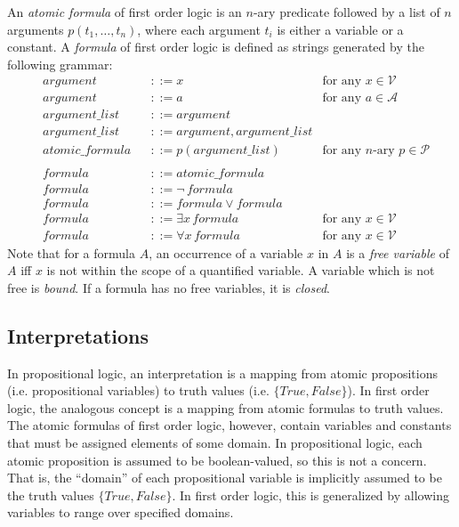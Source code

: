 \documentclass[10pt]{article}
\begin{document}
An \textit{atomic formula} of first order logic is an $n$-ary predicate followed by a list of $n$ arguments $p(t_1,\dots,t_n)$, where each argument $t_i$ is either a variable or a constant. A \textit{formula} of first order logic is defined as strings generated by the following grammar:
\begin{align*}
    &argument& &::= x \qquad &\text{for any } x\in \mathcal{V}\\
    &argument& &::= a \qquad &\text{for any } a\in \mathcal{A}\\
    &argument\_list& &::= argument\\
    &argument\_list& &::= argument,argument\_list\\
    &atomic\_formula& &::= p(argument\_list) \qquad &\text{for any $n$-ary } p\in \mathcal{P}\\
    \\
    &formula& &::= atomic\_formula\\
    &formula& &::= \neg \, formula\\
    &formula& &::= formula \vee formula\\
    &formula& &::= \exists x \, formula \qquad &\text{for any } x \in \mathcal{V}\\
    &formula& &::= \forall x \, formula \qquad &\text{for any } x \in \mathcal{V}
\end{align*}
Note that for a formula $A$, an occurrence of a variable $x$ in $A$ is a \textit{free variable} of $A$ iff $x$ is not within the scope of a quantified variable. A variable which is not free is \textit{bound}. If a formula has no free variables, it is \textit{closed}.

\subsection{Interpretations}

In propositional logic, an interpretation is a mapping from atomic propositions (i.e. propositional variables) to truth values (i.e. $\{True, False\}$). In first order logic, the analogous concept is a mapping from atomic formulas to truth values. The atomic formulas of first order logic, however, contain variables and constants that must be assigned elements of some domain. In propositional logic, each atomic proposition is assumed to be boolean-valued, so this is not a concern. That is, the ``domain'' of each propositional variable is implicitly assumed to be the truth values $\{True,False\}$. In first order logic, this is generalized by allowing variables to range over specified domains.
\end{document}

